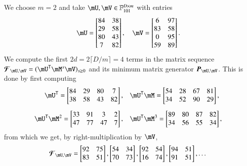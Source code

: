 \documentclass[final,1p,times,authoryear]{elsarticle}
\newcommand{\mat}[1]{\bm{\MakeUppercase{#1}}} %
\newcommand{\seq}{\mat{\mathcal{F}}} %
\newcommand{\trsp}[1]{#1^{\mathsf{T}}} %
\def\F {\ensuremath{\mathbb{F}}}
\newcommand{\mUt}{\trsp{\mU}}
\begin{document}
We choose $m = 2$ and take $\mU,\mV \in \F_{101}^{D\times m}$ with 
entries
\[ \mU = \begin{bmatrix}
    84& 38\\
    29& 58\\
    80& 43\\
    7& 82
  \end{bmatrix},\quad
  \mV = \begin{bmatrix}
    6&  97\\
    83&  58\\
    0&  95\\
    59&  89
  \end{bmatrix}.
\]
We compute the first $2d=2\lceil D/m\rceil =4$ terms in the matrix
sequence $\seq_{\mU,\mV} = (\mUt\mM^s\mV)_{s\ge0}$ and its
minimum matrix generator $\mat{P}_{\mU,\mV}$. This is done
by first computing
\begin{align}\label{exampleproducts}
  \mUt =
  \begin{bmatrix}
    84&  29&  80&   7\\
    38&  58&  43&  82
  \end{bmatrix},
& 
\quad \mUt \mM 
=
\begin{bmatrix}
  54&  28&  67&  81\\
  34&  52&  90&  29
\end{bmatrix},
\\[2mm]
\mUt \mM^2 
=
\begin{bmatrix}
  33&  91&   3&  2\\
  47&  77&  47&  7
\end{bmatrix},
 &\quad \mUt \mM^3 
 =
 \begin{bmatrix}
   89&  80&  87&  82\\
   34&  56&  55&  34
 \end{bmatrix}, \nonumber
\end{align}
from which we get, by right-multiplication by $\mV$,
\[
  \seq_{\mU,\mV} =
  \begin{bmatrix}
    92& 75\\  
    83& 51
  \end{bmatrix},
  \begin{bmatrix}
    54& 34\\  
    70& 73
  \end{bmatrix},
  \begin{bmatrix}
    92& 54\\  
    16& 74
  \end{bmatrix},
  \begin{bmatrix}
    94& 51\\
    91& 51
  \end{bmatrix},\dots
\]
\end{document}
